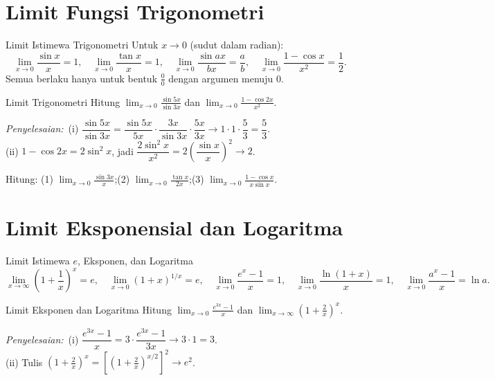 \documentclass[11pt,a4paper]{report}
\theoremstyle{gaya}
\newcommand{\jawab}{\par\smallskip\noindent\textit{\textcolor{oranye}{Penyelesaian:}}\ }
\begin{document}
\section{Limit Fungsi Trigonometri}
\begin{konsep}{Limit Istimewa Trigonometri}
Untuk $x\to0$ (sudut dalam radian):
\[
\lim_{x\to0}\frac{\sin x}{x}=1,\quad
\lim_{x\to0}\frac{\tan x}{x}=1,\quad
\lim_{x\to0}\frac{\sin ax}{bx}=\frac ab,\quad
\lim_{x\to0}\frac{1-\cos x}{x^2}=\frac12.
\]
Semua berlaku hanya untuk bentuk $\tfrac00$ dengan argumen menuju $0$.
\end{konsep}

\begin{contoh}{Limit Trigonometri}
Hitung $\displaystyle\lim_{x\to0}\frac{\sin 5x}{\sin 3x}$ dan $\displaystyle\lim_{x\to0}\frac{1-\cos 2x}{x^2}$.

\jawab (i) $\dfrac{\sin5x}{\sin3x}=\dfrac{\sin5x}{5x}\cdot\dfrac{3x}{\sin3x}\cdot\dfrac{5x}{3x}\to1\cdot1\cdot\dfrac53=\dfrac53$. \\
(ii) $1-\cos2x=2\sin^2x$, jadi $\dfrac{2\sin^2x}{x^2}=2\left(\dfrac{\sin x}{x}\right)^2\to2$.
\end{contoh}

\begin{latihan}
Hitung: (1) $\displaystyle\lim_{x\to0}\frac{\sin 3x}{x}$;\quad (2) $\displaystyle\lim_{x\to0}\frac{\tan x}{2x}$;\quad (3) $\displaystyle\lim_{x\to0}\frac{1-\cos x}{x\sin x}$.
\end{latihan}

\section{Limit Eksponensial dan Logaritma}
\begin{konsep}{Limit Istimewa $e$, Eksponen, dan Logaritma}
\[
\lim_{x\to\infty}\!\left(1+\frac1x\right)^{x}=e,\quad
\lim_{x\to0}(1+x)^{1/x}=e,\quad
\lim_{x\to0}\frac{e^x-1}{x}=1,\quad
\lim_{x\to0}\frac{\ln(1+x)}{x}=1,\quad
\lim_{x\to0}\frac{a^x-1}{x}=\ln a.
\]
\end{konsep}

\begin{contoh}{Limit Eksponen dan Logaritma}
Hitung $\displaystyle\lim_{x\to0}\frac{e^{3x}-1}{x}$ dan $\displaystyle\lim_{x\to\infty}\left(1+\frac2x\right)^{x}$.

\jawab (i) $\dfrac{e^{3x}-1}{x}=3\cdot\dfrac{e^{3x}-1}{3x}\to3\cdot1=3$. \\
(ii) Tulis $\left(1+\tfrac2x\right)^x=\left[\left(1+\tfrac2x\right)^{x/2}\right]^{2}\to e^{2}$.
\end{contoh}
\end{document}

